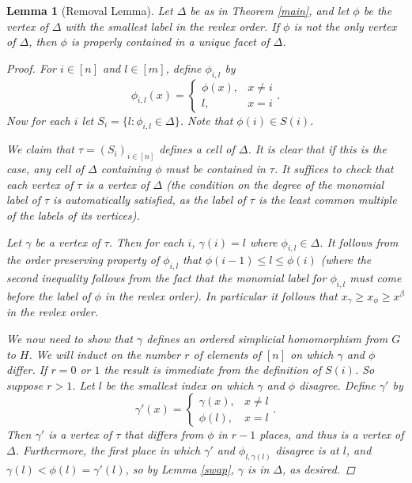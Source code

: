 \documentclass[11pt]{amsart}
\newtheorem{lemma}[theorem]{Lemma}
\theoremstyle{definition}
\numberwithin{equation}{section}
\theoremstyle{remark}
\numberwithin{equation}{section}
\begin{document}
\begin{lemma}[Removal Lemma] \label{max} 
Let $\Delta$ be as in Theorem \ref{main}, and let $\phi$ be the vertex of $\Delta$ with the smallest label in the revlex order. 
If $\phi$ is not the only vertex of $\Delta$, then $\phi$ is properly contained in a unique facet of $\Delta$.

\begin{proof}  
For $i\in [n]$ and $l \in [m]$, define $\phi_{i,l}$ by
$$
\phi_{i,l}(x) = \begin{cases} \phi(x), & x \neq i\\ l, & x=i\end{cases}.
$$
Now for each $i$ let $S_i = \{ l : \phi_{i,l} \in \Delta \}$. Note that $\phi(i) \in S(i)$.

We claim that $\tau = (S_i)_{i \in [n]}$ defines a cell of $\Delta$. It is clear that if this is the case, any cell of $\Delta$ containing $\phi$ must be contained in $\tau$. It suffices to check that each vertex of $\tau$ is a vertex of $\Delta$ (the condition on the degree of the monomial label of $\tau$ is automatically satisfied, as the label of $\tau$ is the least common multiple of the labels of its vertices).

Let $\gamma$ be a vertex of $\tau$. Then for each $i$, $\gamma(i) = l$ where  $\phi_{i,l} \in \Delta$. It follows from the order preserving property of $\phi_{i,l}$  that $\phi(i-1) \leq l \leq \phi(i)$ (where the second inequality follows from the fact that the monomial label for $\phi_{i,l}$ must come before the label of $\phi$ in the revlex order). In particular it follows that  $x_{\gamma} \geq x_{\phi} \geq x^{\beta}$ in the revlex order.

We now need to show that $\gamma$ defines an ordered simplicial homomorphism from $G$ to $H$. We will induct on the number $r$ of elements of $[n]$ on which $\gamma$ and $\phi$ differ. If $r= 0$ or $1$ the result is immediate from the definition of $S(i)$. So suppose $r >1$. Let $l$ be the smallest index on which $\gamma$ and $\phi$ disagree. Define $\gamma'$ by 
$$
\gamma'(x) = \begin{cases} \gamma(x), & x \neq l\\ \phi(l), & x=l\end{cases}.
$$
Then $\gamma'$ is a vertex of $\tau$ that differs from $\phi$ in $r-1$ places, and thus is a vertex of $\Delta$. Furthermore, the first place in which $\gamma'$ and $\phi_{l, \gamma(l)}$ disagree is at $l$, and $\gamma(l) < \phi(l) =\gamma'(l)$, so by Lemma \ref{swap}, $\gamma$ is in $\Delta$, as desired.


\end{proof}
\end{lemma}
\end{document}
